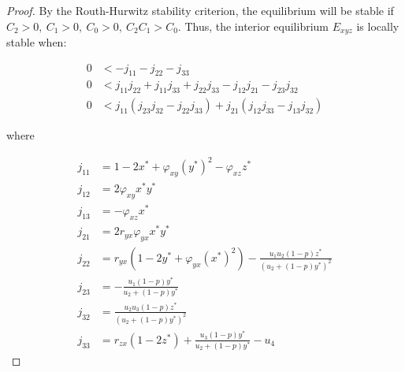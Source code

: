 \begin{proof}
    By the Routh-Hurwitz stability criterion, the equilibrium will be stable if $C_2>0,\ C_1>0,\ C_0>0,\ C_2C_1>C_0$. Thus, the interior equilibrium $E_{xyz}$ is locally stable when:

    \begin{align*}
        0 &< -j_{11}-j_{22}-j_{33}\\
        0 &< j_{11}j_{22}+j_{11}j_{33}+j_{22}j_{33}-j_{12}j_{21}-j_{23}j_{32}\\
        0 &< j_{11}\left(j_{23}j_{32}-j_{22}j_{33}\right)+j_{21}\left(j_{12}j_{33}-j_{13}j_{32}\right)
    \end{align*}

    where
    
    \begin{align*}
        j_{11} &= 1-2x^*+\varphi_{xy}\left(y^*\right)^2-\varphi_{xz}z^*\\
        j_{12} &= 2\varphi_{xy}x^*y^*\\
        j_{13} &= -\varphi_{xz}x^*\\
        j_{21} &= 2r_{yx}\varphi_{yx}x^*y^*\\
        j_{22} &= r_{yx}\left(1-2y^*+\varphi_{yx}\left(x^*\right)^2\right)-\frac{u_1u_2\left(1-p\right)z^*}{\left(u_2+\left(1-p\right)y^*\right)^2}\\
        j_{23} &= -\frac{u_1\left(1-p\right)y^*}{u_2+\left(1-p\right)y^*}\\
        j_{32} &= \frac{u_2u_3\left(1-p\right)z^*}{\left(u_2+\left(1-p\right)y^*\right)^2}\\
        j_{33} &= r_{zx}\left(1-2z^*\right)+\frac{u_3\left(1-p\right)y^*}{u_2+\left(1-p\right)y^*}-u_4
    \end{align*}
\end{proof}

    
    

    
    
